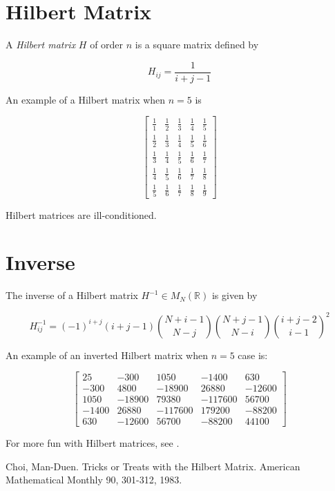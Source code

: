\documentclass[12pt]{article}
\begin{document}
\section{Hilbert Matrix}

A \emph{Hilbert matrix} $H$ of order $n$ is a square matrix defined by

$$ H_{ij} = \frac{1}{i + j - 1} $$

An example of a Hilbert matrix when $n = 5$ is 

$$ \begin{bmatrix}
  \frac{1}{1} & \frac{1}{2} & \frac{1}{3} & \frac{1}{4} & \frac{1}{5} \\
  \frac{1}{2} & \frac{1}{3} & \frac{1}{4} & \frac{1}{5} & \frac{1}{6} \\
  \frac{1}{3} & \frac{1}{4} & \frac{1}{5} & \frac{1}{6} & \frac{1}{7} \\
  \frac{1}{4} & \frac{1}{5} & \frac{1}{6} & \frac{1}{7} & \frac{1}{8} \\
  \frac{1}{5} & \frac{1}{6} & \frac{1}{7} & \frac{1}{8} & \frac{1}{9}
\end{bmatrix} $$

Hilbert matrices are ill-conditioned.

\section{Inverse}

The inverse of a Hilbert matrix  $H^{-1}\in M_N(\mathbb{R})$ is given by

$$ H^{-1}_{ij} = (-1)^{i+j}(i+j-1){N+i-1 \choose N-j}{N+j-1 \choose N-i}{i+j-2 \choose i-1}^2 $$

An example of an inverted Hilbert matrix when $n=5$ case is:

$$ \begin{bmatrix}
         25    &    -300    &    1050    &   -1400    &     630  \\
        -300   &     4800   &   -18900   &    26880   &   -12600 \\
        1050   &   -18900   &    79380   &  -117600   &    56700 \\
       -1400   &    26880   &  -117600   &   179200   &   -88200 \\
         630   &   -12600   &    56700   &   -88200   &    44100 
\end{bmatrix} $$

For more fun with Hilbert matrices, see \cite{Choi}.

\begin{thebibliography}{3}
  Choi,  Man-Duen. Tricks or Treats with the Hilbert Matrix. American Mathematical Monthly 90, 301-312, 1983.
\end{thebibliography}
\end{document}
